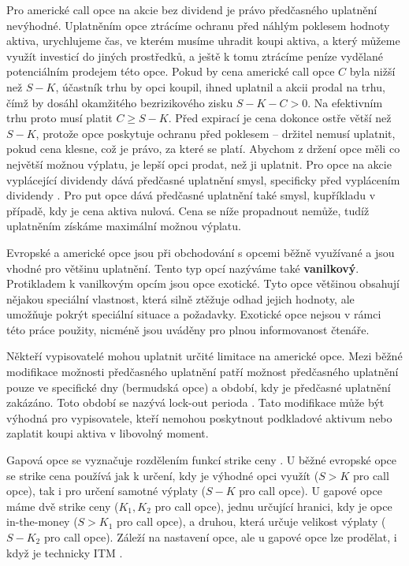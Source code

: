 \documentclass[male,czech,api_bc]{kitheses}
\begin{document}
  Pro americké call opce na akcie bez dividend je právo předčasného uplatnění nevýhodné. Uplatněním opce ztrácíme ochranu před náhlým poklesem hodnoty aktiva, urychlujeme čas, ve kterém musíme uhradit koupi aktiva, a který můžeme využít investicí do jiných prostředků, a ještě k tomu ztrácíme peníze vydělané potenciálním prodejem této opce.
  Pokud by cena americké call opce $C$ byla nižší než $S - K$, účastník trhu by opci koupil, ihned uplatnil a akcii prodal na trhu, čímž by dosáhl okamžitého bezrizikového zisku $S - K - C > 0$. Na efektivním trhu proto musí platit $C \ge S - K$. Před expirací je cena dokonce ostře větší než $S - K$, protože opce poskytuje ochranu před poklesem – držitel nemusí uplatnit, pokud cena klesne, což je právo, za které se platí. Abychom z držení opce měli co největší možnou výplatu, je lepší opci prodat, než ji uplatnit. Pro opce na akcie vyplácející dividendy dává předčasné uplatnění smysl, specificky před vyplácením dividendy \parencites[s.~291-293]{McDonald2013}. Pro put opce dává předčasné uplatnění také smysl, kupříkladu v případě, kdy je cena aktiva nulová. Cena se níže propadnout nemůže, tudíž uplatněním získáme maximální možnou výplatu.

  Evropské a americké opce jsou při obchodování s opcemi běžně využívané a jsou vhodné pro většinu uplatnění. Tento typ opcí nazýváme také \textbf{vanilkový}. Protikladem k vanilkovým opcím jsou opce exotické. Tyto opce většinou obsahují nějakou speciální vlastnost, která silně ztěžuje odhad jejich hodnoty, ale umožňuje pokrýt speciální situace a požadavky. Exotické opce nejsou v rámci této práce použity, nicméně jsou uváděny pro plnou informovanost čtenáře.

  Někteří vypisovatelé mohou uplatnit určité limitace na americké opce. Mezi běžné modifikace možnosti předčasného uplatnění patří možnost předčasného uplatnění pouze ve specifické dny (bermudská opce) a období, kdy je předčasné uplatnění zakázáno. Toto období se nazývá lock-out perioda \parencites[s.~616]{Hull2021}. Tato modifikace může být výhodná pro vypisovatele, kteří nemohou poskytnout podkladové aktivum nebo zaplatit koupi aktiva v libovolný moment.

  Gapová opce se vyznačuje rozdělením funkcí strike ceny \parencites[s.~617]{Hull2021}. U běžné evropské opce se strike cena používá jak k určení, kdy je výhodné opci využít ($S > K$ pro call opce), tak i pro určení samotné výplaty ($S - K$ pro call opce). U gapové opce máme dvě strike ceny ($K_1, K_2$ pro call opce), jednu určující hranici, kdy je opce in-the-money ($S > K_1$ pro call opce), a druhou, která určuje velikost výplaty ($S - K_2$ pro call opce). Záleží na nastavení opce, ale u gapové opce lze prodělat, i když je technicky ITM \parencites[s.~436]{McDonald2013}.
\end{document}
